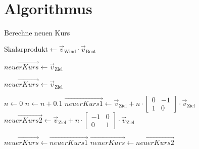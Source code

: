 \chapter{Algorithmus}
\label{appendix:algorythmus}






\begin{algorithm}
\caption{Berechne neuen Kurs}
\begin{algorithmic}[1]
    \State $\text{Skalarprodukt} \gets \vec{v}_{\text{Wind}} \cdot \vec{v}_{\text{Boot}}$
    
    \State $\vec{neuerKurs} \gets \vec{v}_{\text{Ziel}}$
    
            \State $\vec{neuerKurs} \gets \vec{v}_{\text{Ziel}}$
            \State \Return {}
        \EndIf
        
        \State $n \gets 0$
            \State $n \gets n + 0.1$
            \State $\vec{neuerKurs1} \gets \vec{v}_{\text{Ziel}} + n \cdot \begin{bmatrix}0 & -1 \\ 1 & 0\end{bmatrix} \cdot \vec{v}_{\text{Ziel}}$
            \State $\vec{neuerKurs2} \gets \vec{v}_{\text{Ziel}} + n \cdot \begin{bmatrix}-1 & 0 \\ 0 & 1\end{bmatrix} \cdot \vec{v}_{\text{Ziel}}$
            
                \State $\vec{neuerKurs} \gets \vec{neuerKurs1}$
            \Else
                \State $\vec{neuerKurs} \gets \vec{neuerKurs2}$
            \EndIf
        \EndWhile
        
        \State \Return {}
    \EndIf
\EndFunction
\end{algorithmic}
\end{algorithm}
